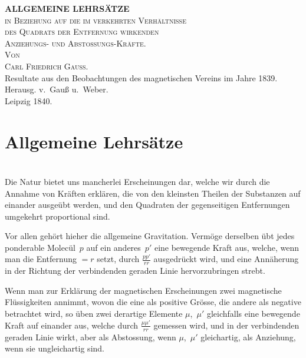 \documentclass[12pt,a4paper]{article}
\begin{document}
\newpage

\begin{center}
{\Large\bfseries ALLGEMEINE LEHRSÄTZE}\\[0.3cm]
{\large\scshape in Beziehung auf die im verkehrten Verhältnisse\\[0.1cm]
des Quadrats der Entfernung wirkenden\\[0.1cm]
Anziehungs- und Abstossungs-Kräfte.}\\[1cm]
{\scshape Von}\\[0.3cm]
{\Large\scshape Carl Friedrich Gauß.}\\[1.5cm]
{\small Resultate aus den Beobachtungen des magnetischen Vereins im Jahre 1839.}\\[0.1cm]
{\small Herausg. v.\ Gauß u.\ Weber.}\\[0.1cm]
{\small Leipzig 1840.}
\end{center}

\vspace{2cm}
\thispagestyle{empty}
\newpage

\section*{Allgemeine Lehrsätze}

\setcounter{section}{0}
\renewcommand{\thesection}{\arabic{section}.}

\section{}
Die Natur bietet uns mancherlei Erscheinungen dar, welche wir durch die
Annahme von Kräften erklären, die von den kleinsten Theilen der Substanzen auf
einander ausgeübt werden, und den Quadraten der gegenseitigen Entfernungen
umgekehrt proportional sind.

Vor allen gehört hieher die allgemeine Gravitation. Vermöge derselben übt
jedes ponderable Molecül~$p$ auf ein anderes~$p'$ eine bewegende Kraft aus, welche,
wenn man die Entfernung $=r$ setzt, durch $\tfrac{pp'}{rr}$ ausgedrückt wird, und eine
Annäherung in der Richtung der verbindenden geraden Linie hervorzubringen
strebt.

Wenn man zur Erklärung der magnetischen Erscheinungen zwei magnetische
Flüssigkeiten annimmt, wovon die eine als positive Grösse, die andere als
negative betrachtet wird, so üben zwei derartige Elemente $\mu$,~$\mu'$ gleichfalls eine
bewegende Kraft auf einander aus, welche durch $\tfrac{\mu\mu'}{rr}$ gemessen wird, und in der
verbindenden geraden Linie wirkt, aber als Abstossung, wenn $\mu$,~$\mu'$ gleichartig,
als Anziehung, wenn sie ungleichartig sind.
\end{document}

